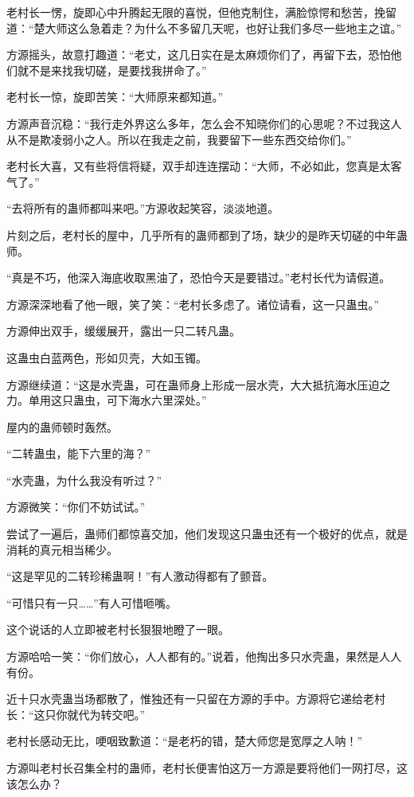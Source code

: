 \begin{this_body}
老村长一愣，旋即心中升腾起无限的喜悦，但他克制住，满脸惊愕和愁苦，挽留道：“楚大师这么急着走？为什么不多留几天呢，也好让我们多尽一些地主之谊。”

方源摇头，故意打趣道：“老丈，这几日实在是太麻烦你们了，再留下去，恐怕他们就不是来找我切磋，是要找我拼命了。”

老村长一惊，旋即苦笑：“大师原来都知道。”

方源声音沉稳：“我行走外界这么多年，怎么会不知晓你们的心思呢？不过我这人从不是欺凌弱小之人。所以在我走之前，我要留下一些东西交给你们。”

老村长大喜，又有些将信将疑，双手却连连摆动：“大师，不必如此，您真是太客气了。”

“去将所有的蛊师都叫来吧。”方源收起笑容，淡淡地道。

片刻之后，老村长的屋中，几乎所有的蛊师都到了场，缺少的是昨天切磋的中年蛊师。

“真是不巧，他深入海底收取黑油了，恐怕今天是要错过。”老村长代为请假道。

方源深深地看了他一眼，笑了笑：“老村长多虑了。诸位请看，这一只蛊虫。”

方源伸出双手，缓缓展开，露出一只二转凡蛊。

这蛊虫白蓝两色，形如贝壳，大如玉镯。

方源继续道：“这是水壳蛊，可在蛊师身上形成一层水壳，大大抵抗海水压迫之力。单用这只蛊虫，可下海水六里深处。”

屋内的蛊师顿时轰然。

“二转蛊虫，能下六里的海？”

“水壳蛊，为什么我没有听过？”

方源微笑：“你们不妨试试。”

尝试了一遍后，蛊师们都惊喜交加，他们发现这只蛊虫还有一个极好的优点，就是消耗的真元相当稀少。

“这是罕见的二转珍稀蛊啊！”有人激动得都有了颤音。

“可惜只有一只……”有人可惜咂嘴。

这个说话的人立即被老村长狠狠地瞪了一眼。

方源哈哈一笑：“你们放心，人人都有的。”说着，他掏出多只水壳蛊，果然是人人有份。

近十只水壳蛊当场都散了，惟独还有一只留在方源的手中。方源将它递给老村长：“这只你就代为转交吧。”

老村长感动无比，哽咽致歉道：“是老朽的错，楚大师您是宽厚之人呐！”

方源叫老村长召集全村的蛊师，老村长便害怕这万一方源是要将他们一网打尽，这该怎么办？


\end{this_body}
